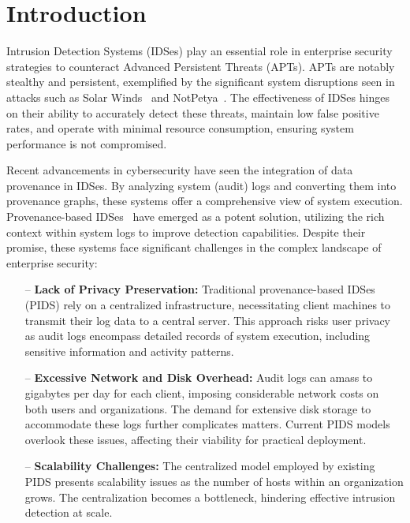 \section{Introduction}
\label{s:intro}

Intrusion Detection Systems (IDSes) play an essential role in enterprise security strategies to counteract Advanced Persistent Threats (APTs). APTs are notably stealthy and persistent, exemplified by the significant system disruptions seen in attacks such as Solar Winds~\cite{solarwinds} and NotPetya~\cite{notpetya}. The effectiveness of IDSes hinges on their ability to accurately detect these threats, maintain low false positive rates, and operate with minimal resource consumption, ensuring system performance is not compromised.

Recent advancements in cybersecurity have seen the integration of data provenance in IDSes. By analyzing system (audit) logs and converting them into provenance graphs, these systems offer a comprehensive view of system execution. Provenance-based IDSes~\cite{streamspot,provdetector2020,wang2022threatrace,shadewatcher,yangprographer,han2020unicorn} have emerged as a potent solution, utilizing the rich context within system logs to improve detection capabilities. Despite their promise, these systems face significant challenges in the complex landscape of enterprise security:

\begin{itemize} [leftmargin=*]
    \item[--] \textbf{Lack of Privacy Preservation:} Traditional provenance-based IDSes (PIDS) rely on a centralized infrastructure, necessitating client machines to transmit their log data to a central server. This approach risks user privacy as audit logs encompass detailed records of system execution, including sensitive information and activity patterns.
    
    \item[--] \textbf{Excessive Network and Disk Overhead:} Audit logs can amass to gigabytes per day for each client, imposing considerable network costs on both users and organizations. The demand for extensive disk storage to accommodate these logs further complicates matters. Current PIDS models overlook these issues, affecting their viability for practical deployment.
    
    \item[--] \textbf{Scalability Challenges:} The centralized model employed by existing PIDS presents scalability issues as the number of hosts within an organization grows. The centralization becomes a bottleneck, hindering effective intrusion detection at scale.
\end{itemize}

